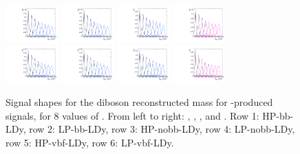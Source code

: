 \begin{figure}[htbp]
  \includegraphics[width=0.18\textwidth]{fig/analysis/templateSignalVsMX_fromDC_VBFGbuToWW_MVV_mu_HP_vbf_DEtaLo.pdf}
  \includegraphics[width=0.18\textwidth]{fig/analysis/templateSignalVsMX_fromDC_VBFRadToWW_MVV_mu_HP_vbf_DEtaLo.pdf}
  \includegraphics[width=0.18\textwidth]{fig/analysis/templateSignalVsMX_fromDC_VBFZprToWW_MVV_mu_HP_vbf_DEtaLo.pdf}
  \includegraphics[width=0.18\textwidth]{fig/analysis/templateSignalVsMX_fromDC_VBFWprToWZ_MVV_mu_HP_vbf_DEtaLo.pdf}\\
  \includegraphics[width=0.18\textwidth]{fig/analysis/templateSignalVsMX_fromDC_VBFGbuToWW_MVV_mu_LP_vbf_DEtaLo.pdf}
  \includegraphics[width=0.18\textwidth]{fig/analysis/templateSignalVsMX_fromDC_VBFRadToWW_MVV_mu_LP_vbf_DEtaLo.pdf}
  \includegraphics[width=0.18\textwidth]{fig/analysis/templateSignalVsMX_fromDC_VBFZprToWW_MVV_mu_LP_vbf_DEtaLo.pdf}
  \includegraphics[width=0.18\textwidth]{fig/analysis/templateSignalVsMX_fromDC_VBFWprToWZ_MVV_mu_LP_vbf_DEtaLo.pdf}\\
  \caption{
    Signal shapes for the diboson reconstructed mass \MVV for \VBF-produced signals, for 8 values of \MX.
    From left to right: \GBulktoWW, \RadtoWW, \ZprtoWW, and \WprtoWZ.
    Row 1: HP-bb-LDy, row 2: LP-bb-LDy, row 3: HP-nobb-LDy, row 4: LP-nobb-LDy, row 5: HP-vbf-LDy, row 6: LP-vbf-LDy.
  }
  \label{fig:MVVShapes_VBF_LDy_Run2}
\end{figure}

